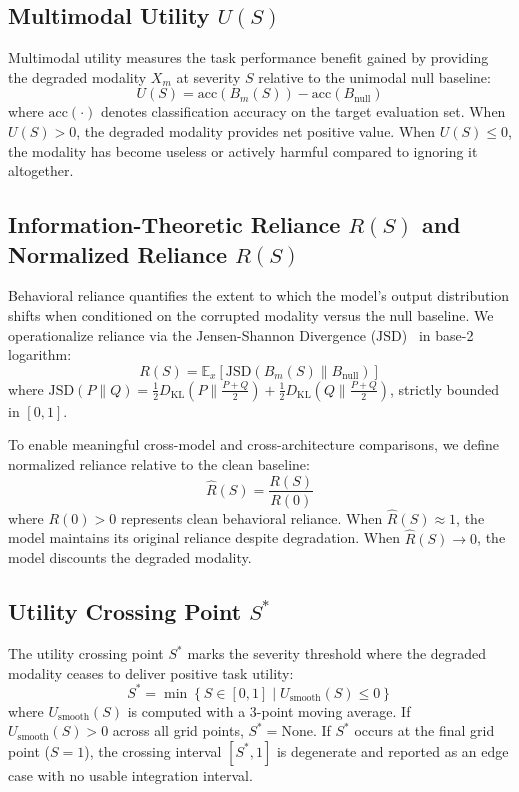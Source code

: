\documentclass[graybox]{svmult}
\newcommand{\jsd}{\text{JSD}}
\newcommand{\dkl}{D_{\text{KL}}}
\begin{document}
\subsection{Multimodal Utility $U(S)$}
Multimodal utility measures the task performance benefit gained by providing the degraded modality $X_m$ at severity $S$ relative to the unimodal null baseline:
\begin{equation}
U(S) = \text{acc}(B_m(S)) - \text{acc}(B_{\text{null}})
\end{equation}
where $\text{acc}(\cdot)$ denotes classification accuracy on the target evaluation set.
When $U(S) > 0$, the degraded modality provides net positive value. When $U(S) \le 0$, the modality has become useless or actively harmful compared to ignoring it altogether.

\subsection{Information-Theoretic Reliance $R(S)$ and Normalized Reliance $\hat{R}(S)$}
Behavioral reliance quantifies the extent to which the model's output distribution shifts when conditioned on the corrupted modality versus the null baseline. We operationalize reliance via the Jensen-Shannon Divergence ($\jsd$)~\cite{lin1991divergence} in base-2 logarithm:
\begin{equation}
R(S) = \mathbb{E}_x \left[ \jsd(B_m(S) \parallel B_{\text{null}}) \right]
\end{equation}
where $\jsd(P \parallel Q) = \frac{1}{2} \dkl\left(P \parallel \frac{P+Q}{2}\right) + \frac{1}{2} \dkl\left(Q \parallel \frac{P+Q}{2}\right)$, strictly bounded in $[0, 1]$.

To enable meaningful cross-model and cross-architecture comparisons, we define normalized reliance relative to the clean baseline:
\begin{equation}
\hat{R}(S) = \frac{R(S)}{R(0)}
\end{equation}
where $R(0) > 0$ represents clean behavioral reliance. When $\hat{R}(S) \approx 1$, the model maintains its original reliance despite degradation. When $\hat{R}(S) \to 0$, the model discounts the degraded modality.

\subsection{Utility Crossing Point $S^*$}
The utility crossing point $S^*$ marks the severity threshold where the degraded modality ceases to deliver positive task utility:
\begin{equation}
S^* = \min \left\{ S \in [0, 1] \mid U_{\text{smooth}}(S) \le 0 \right\}
\end{equation}
where $U_{\text{smooth}}(S)$ is computed with a 3-point moving average. If $U_{\text{smooth}}(S) > 0$ across all grid points, $S^* = \text{None}$. If $S^*$ occurs at the final grid point ($S=1$), the crossing interval $[S^*, 1]$ is degenerate and reported as an edge case with no usable integration interval.
\end{document}

